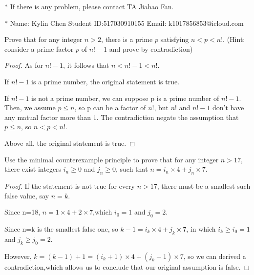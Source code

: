 \documentclass[12pt,a4paper]{article}
\theoremstyle{definition}
\begin{document}
\noindent

\noindent{}
\begin{center}
\footnotesize{\color{red}$*$ If there is any problem, please contact TA Jiahao Fan.}

\footnotesize{\color{blue}$*$ Name: Kylin Chen  \quad Student ID:517030910155 \quad Email: k1017856853@icloud.com}
\end{center}

\begin{enumerate}
    \item
    Prove that for any integer $n>2$, there is a prime $p$ satisfying $n<p<n!$. {\color{blue}(Hint: consider a prime factor $p$ of $n!-1$ and prove by contradiction)}
    \begin{proof}
        As for $n!-1$, it follows that $n<n!-1<n!$.\item
        If $n!-1$ is a prime number, the original statement is true.\item
        If $n!-1$ is not a prime number, we can suppose p is a prime number of $n!-1$.
        Then, we assume $p \le n$, so p can be a factor of $n!$, but $n!$ and $n!-1$ don't have any matual factor more than $1$. The contradiction negate the assumption that 
        $p \le n$, so $n<p<n!$.\item
        Above all, the original statement is true.
    \end{proof}

    \item
    Use the minimal counterexample principle to prove that for any integer $n>17$, there exist integers $i_n\ge 0$ and $j_n\ge 0$, such that $n = i_n \times 4 + j_n \times 7$.
    \begin{proof}
        If the statement is not true for every $n>17$, there must be a smallest such false value, say $n=k$.\item
        Since n=18, $n=1 \times 4 +2 \times 7$,which $i_0=1$ and $j_0=2$.\item
        Since n=k is the smallest false one, so $k-1=i_k \times 4 +j_k \times 7$, in which $i_k \ge i_0=1$ and $j_k \ge j_0=2$.\item
        However, $k=(k-1)+1=(i_k+1) \times 4 +(j_k-1) \times 7$, so we can derived a contradiction,which allows us to conclude that our original assumption is false.
    \end{proof}


\end{enumerate}
\end{document}
